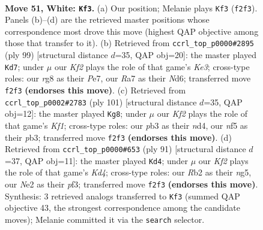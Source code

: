 \documentclass[11pt]{article}
\begin{document}
\clearpage

\begin{figure}[p]\centering
\begin{subfigure}{0.46\textwidth}\centering
\resizebox{\linewidth}{!}{%
\newchessgame
\chessboard[
  setfen={6r1/R7/3pk3/5npp/8/1p6/1R2NKP1/7r w - - 0 51},
  showmover=false,
  pgfstyle=straightmove, color=movearrow, markmove={f2-f3}
]}
\caption{}
\end{subfigure}\hfill
\begin{subfigure}{0.46\textwidth}\centering
\resizebox{\linewidth}{!}{%
\newchessgame
\chessboard[
  setfen={8/4p3/3nk1p1/r6p/PR1K4/2N4P/6P1/8 b - - 21 50},
  showmover=false,
  pgfstyle=straightmove, color=movearrow, markmove={e6-d7}
]}
\caption{}
\end{subfigure}
\\[4pt]
\begin{subfigure}{0.46\textwidth}\centering
\resizebox{\linewidth}{!}{%
\newchessgame
\chessboard[
  setfen={4nk2/R6R/6p1/8/P2Nr3/KP6/6r1/8 b - - 6 51},
  showmover=false,
  pgfstyle=straightmove, color=movearrow, markmove={f8-g8}
]}
\caption{}
\end{subfigure}\hfill
\begin{subfigure}{0.46\textwidth}\centering
\resizebox{\linewidth}{!}{%
\newchessgame
\chessboard[
  setfen={8/7p/8/3k2N1/2p5/4RPP1/rn2P3/4K3 b - - 10 46},
  showmover=false,
  pgfstyle=straightmove, color=movearrow, markmove={d5-d4}
]}
\caption{}
\end{subfigure}
\caption{\textbf{Move 51, White: \texttt{Kf3}.} (a) Our position; Melanie plays \texttt{Kf3} (\texttt{f2f3}). Panels (b)--(d) are the retrieved master positions whose correspondence most drove this move (highest QAP objective among those that transfer to it). (b) Retrieved from \texttt{ccrl\_top\_p0000\#2895} (ply 99) [structural distance $d$=35, QAP obj=20]: the master played \texttt{Kd7}; under $\mu$ our \emph{Kf2} plays the role of that game's \emph{Ke3}; cross-type roles: our \emph{r}g8 as their \emph{P}e7, our \emph{R}a7 as their \emph{N}d6; transferred move \texttt{f2f3} \textbf{(endorses this move)}. (c) Retrieved from \texttt{ccrl\_top\_p0002\#2783} (ply 101) [structural distance $d$=35, QAP obj=12]: the master played \texttt{Kg8}; under $\mu$ our \emph{Kf2} plays the role of that game's \emph{Kf1}; cross-type roles: our \emph{p}b3 as their \emph{n}d4, our \emph{n}f5 as their \emph{p}b3; transferred move \texttt{f2f3} \textbf{(endorses this move)}. (d) Retrieved from \texttt{ccrl\_top\_p0000\#653} (ply 91) [structural distance $d$=37, QAP obj=11]: the master played \texttt{Kd4}; under $\mu$ our \emph{Kf2} plays the role of that game's \emph{Kd4}; cross-type roles: our \emph{R}b2 as their \emph{n}g5, our \emph{N}e2 as their \emph{p}f3; transferred move \texttt{f2f3} \textbf{(endorses this move)}. Synthesis: 3 retrieved analogs transferred to \texttt{Kf3} (summed QAP objective 43, the strongest correspondence among the candidate moves); Melanie committed it via the \texttt{search} selector.}
\label{fig:thought-m100}
\end{figure}
\end{document}
